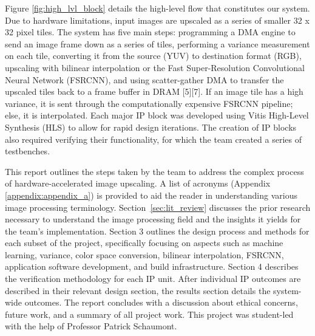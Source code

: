 \documentclass{article}
\begin{document}
\par Figure \ref{fig:high_lvl_block} details the high-level flow that constitutes our system. Due to hardware limitations, input images are upscaled as a series of smaller 32 x 32 pixel tiles. The system has five main steps: programming a DMA engine to send an image frame down as a series of tiles, performing a variance measurement on each tile, converting it from the source (YUV) to destination format (RGB), upscaling with bilinear interpolation or the Fast Super-Resolution Convolutional Neural Network (FSRCNN), and using scatter-gather DMA to transfer the upscaled tiles back to a frame buffer in DRAM [5][7]. If an image tile has a high variance, it is sent through the computationally expensive FSRCNN pipeline; else, it is interpolated. Each major IP block was developed using Vitis High-Level Synthesis (HLS) to allow for rapid design iterations. The creation of IP blocks also required verifying their functionality, for which the team created a series of testbenches.

\par This report outlines the steps taken by the team to address the complex process of hardware-accelerated image upscaling. A list of acronyms (Appendix \ref{appendix:appendix_a}) is provided to aid the reader in understanding various image processing terminology. Section~\ref{sec:lit_review} discusses the prior research necessary to understand the image processing field and the insights it yields for the team’s implementation. Section 3 outlines the design process and methods for each subset of the project, specifically focusing on aspects such as machine learning, variance, color space conversion, bilinear interpolation, FSRCNN, application software development, and build infrastructure. Section 4 describes the verification methodology for each IP unit. After individual IP outcomes are described in their relevant design section, the results section details the system-wide outcomes. The report concludes with a discussion about ethical concerns, future work, and a summary of all project work. This project was student-led with the help of Professor Patrick Schaumont.

\end{document}
